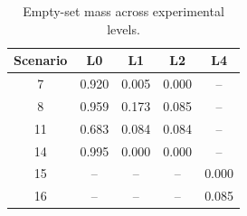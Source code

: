 \begin{table}[t]
\centering
\caption{Empty-set mass across experimental levels.}
\label{tab:conflict_results}
\begin{tabular}{ccccc}
\toprule
Scenario & L0 & L1 & L2 & L4 \\
\midrule
7  & 0.920 & 0.005 & 0.000 & -- \\
8  & 0.959 & 0.173 & 0.085 & -- \\
11 & 0.683 & 0.084 & 0.084 & -- \\
14 & 0.995 & 0.000 & 0.000 & -- \\
15 & --    & --    & --    & 0.000 \\
16 & --    & --    & --    & 0.085 \\
\bottomrule
\end{tabular}
\end{table}
